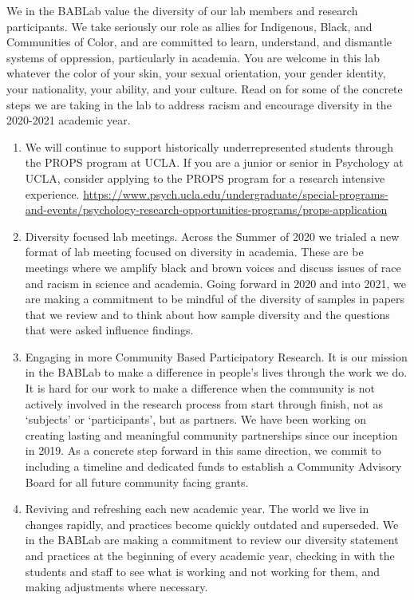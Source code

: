 \documentclass[
]{book}
\begin{document}
We in the BABLab value the diversity of our lab members and research participants. We take seriously our role as allies for Indigenous, Black, and Communities of Color, and are committed to learn, understand, and dismantle systems of oppression, particularly in academia. You are welcome in this lab whatever the color of your skin, your sexual orientation, your gender identity, your nationality, your ability, and your culture. Read on for some of the concrete steps we are taking in the lab to address racism and encourage diversity in the 2020-2021 academic year.

\begin{enumerate}
\def\labelenumi{\arabic{enumi}.}
\item
  We will continue to support historically underrepresented students through the PROPS program at UCLA.
  If you are a junior or senior in Psychology at UCLA, consider applying to the PROPS program for a research intensive experience. \url{https://www.psych.ucla.edu/undergraduate/special-programs-and-events/psychology-research-opportunities-programs/props-application}
\item
  Diversity focused lab meetings.
  Across the Summer of 2020 we trialed a new format of lab meeting focused on diversity in academia. These are be meetings where we amplify black and brown voices and discuss issues of race and racism in science and academia. Going forward in 2020 and into 2021, we are making a commitment to be mindful of the diversity of samples in papers that we review and to think about how sample diversity and the questions that were asked influence findings.
\item
  Engaging in more Community Based Participatory Research.
  It is our mission in the BABLab to make a difference in people's lives through the work we do. It is hard for our work to make a difference when the community is not actively involved in the research process from start through finish, not as `subjects' or `participants', but as partners. We have been working on creating lasting and meaningful community partnerships since our inception in 2019. As a concrete step forward in this same direction, we commit to including a timeline and dedicated funds to establish a Community Advisory Board for all future community facing grants.
\item
  Reviving and refreshing each new academic year.
  The world we live in changes rapidly, and practices become quickly outdated and superseded. We in the BABLab are making a commitment to review our diversity statement and practices at the beginning of every academic year, checking in with the students and staff to see what is working and not working for them, and making adjustments where necessary.
\end{enumerate}
\end{document}
